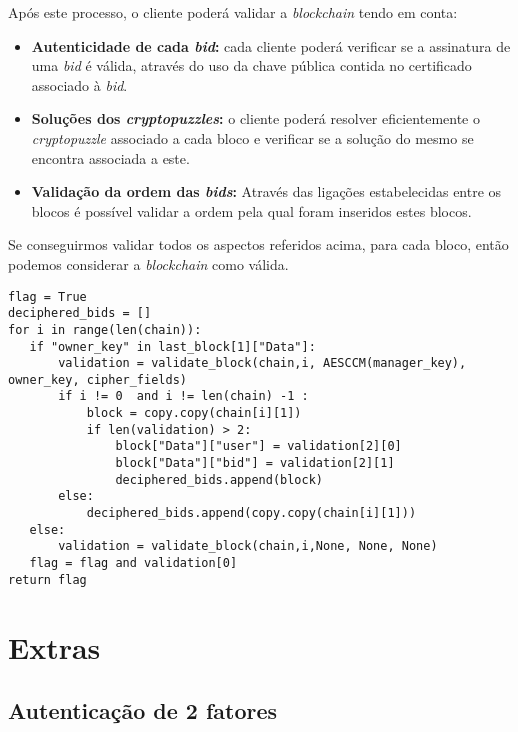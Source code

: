\documentclass[12pt]{article}
\begin{document}
\par Após este processo, o cliente poderá validar a \textit{blockchain} tendo em conta:
\begin{itemize}
  \item \textbf{Autenticidade de cada \textit{bid}:} cada cliente poderá verificar se a assinatura de uma \textit{bid} é válida, através do uso da chave pública contida no certificado associado à \textit{bid}.
  \item \textbf{Soluções dos \textit{cryptopuzzles}:} o cliente poderá resolver eficientemente o \textit{cryptopuzzle} associado a cada bloco e verificar se a solução do mesmo se encontra associada a este.
  \item \textbf{Validação da ordem das \textit{bids}: } Através das ligações estabelecidas entre  os blocos é possível validar a ordem pela qual foram inseridos estes blocos.
\end{itemize}

\par Se conseguirmos validar todos os aspectos referidos acima, para cada bloco, então podemos considerar a \textit{blockchain} como válida.

\vspace{5mm} %

\begin{lstlisting}[caption={Validação da  \textit{Blockchain}},captionpos=b]
flag = True
deciphered_bids = []
for i in range(len(chain)):
   if "owner_key" in last_block[1]["Data"]:
       validation = validate_block(chain,i, AESCCM(manager_key), owner_key, cipher_fields)
       if i != 0  and i != len(chain) -1 :
           block = copy.copy(chain[i][1])
           if len(validation) > 2:
               block["Data"]["user"] = validation[2][0]
               block["Data"]["bid"] = validation[2][1]
               deciphered_bids.append(block)
       else:
           deciphered_bids.append(copy.copy(chain[i][1]))
   else:
       validation = validate_block(chain,i,None, None, None)
   flag = flag and validation[0]
return flag
\end{lstlisting}



\pagebreak

\section{Extras}

\subsection{Autenticação de 2 fatores}
\end{document}

